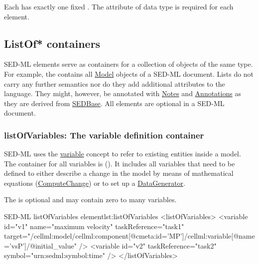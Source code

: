 \subsubsection{}
\label{sec:value}
Each  has exactly one fixed . The  attribute of data type  is required for each  element. 


\subsection{ListOf* containers}
\label{listOfElements}
SED-ML  elements serve as containers  for a collection of objects of the same type. For example, the  contains all \hyperref[class:model]{Model} objects of a SED-ML document. Lists do not carry any further semantics nor do they add additional attributes to the language. They might, however, be annotated with \hyperref[class:notes]{Notes} and \hyperref[class:annotation]{Annotations} as they are derived from \hyperref[class:sedBase]{SEDBase}. All  elements are optional in a SED-ML document. 


\subsubsection{listOfVariables: The variable definition container}
\label{sec:listOfVariables}

SED-ML uses the \hyperref[class:variable]{variable} concept to refer to existing entities inside a model. The container for all variables is   (). It includes all variables that need to be defined to either describe a change in the model by means of mathematical equations (\hyperref[class:computeChange]{ComputeChange}) or to set up a \hyperref[class:dataGenerator]{DataGenerator}.


 The  is optional and may contain zero to many variables. 

\begin{myXmlLst}{SED-ML listOfVariables element}{lst:listOfVariables}
<listOfVariables>
	<variable id="v1" name="maximum velocity" taskReference="task1" 
		target="/cellml:model/cellml:component[@cmeta:id='MP']/cellml:variable[@name='vsP']/@initial_value" />
	<variable id="v2" taskReference="task2" symbol="urn:sedml:symbol:time" />
</listOfVariables>
\end{myXmlLst}


